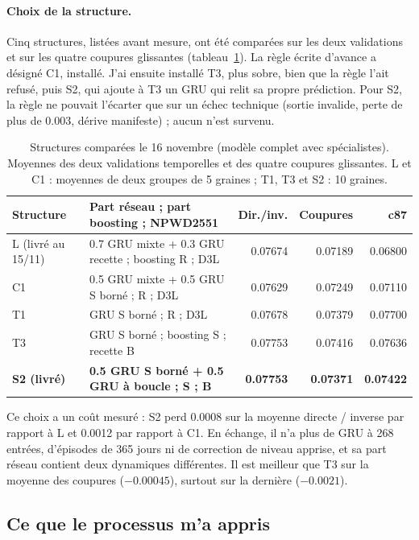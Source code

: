 \documentclass[11pt,a4paper]{article}
\begin{document}
\paragraph{Choix de la structure.} Cinq structures, listées avant mesure, ont été comparées sur les deux validations et sur les quatre coupures glissantes (tableau~\ref{tab:structures}). La règle écrite d'avance a désigné C1, installé. J'ai ensuite installé T3, plus sobre, bien que la règle l'ait refusé, puis S2, qui ajoute à T3 un GRU qui relit sa propre prédiction. Pour S2, la règle ne pouvait l'écarter que sur un échec technique (sortie invalide, perte de plus de 0.003, dérive manifeste) ; aucun n'est survenu.

\begin{table}[!htb]
\centering\small
\caption{Structures comparées le 16 novembre (modèle complet avec spécialistes). Moyennes des deux validations temporelles et des quatre coupures glissantes. L et C1 : moyennes de deux groupes de 5 graines ; T1, T3 et S2 : 10 graines.}
\label{tab:structures}
\begin{tabularx}{\linewidth}{l X r r r}
\toprule
Structure & Part réseau ; part boosting ; NPWD2551 & Dir./inv. & Coupures & c87 \\
\midrule
L (livré au 15/11) & 0.7 GRU mixte + 0.3 GRU recette ; boosting R ; D3L & 0.07674 & 0.07189 & 0.06800 \\
C1 & 0.5 GRU mixte + 0.5 GRU S borné ; R ; D3L & 0.07629 & 0.07249 & 0.07110 \\
T1 & GRU S borné ; R ; D3L & 0.07678 & 0.07379 & 0.07700 \\
T3 & GRU S borné ; boosting S ; recette B & 0.07753 & 0.07416 & 0.07636 \\
\rowcolor{fond} \textbf{S2 (livré)} & \textbf{0.5 GRU S borné + 0.5 GRU à boucle ; S ; B} & \textbf{0.07753} & \textbf{0.07371} & \textbf{0.07422} \\
\bottomrule
\end{tabularx}
\end{table}

Ce choix a un coût mesuré : S2 perd 0.0008 sur la moyenne directe / inverse par rapport à L et 0.0012 par rapport à C1. En échange, il n'a plus de GRU à 268 entrées, d'épisodes de 365 jours ni de correction de niveau apprise, et sa part réseau contient deux dynamiques différentes. Il est meilleur que T3 sur la moyenne des coupures ($-0.00045$), surtout sur la dernière ($-0.0021$).

\subsection{Ce que le processus m'a appris}
\end{document}
